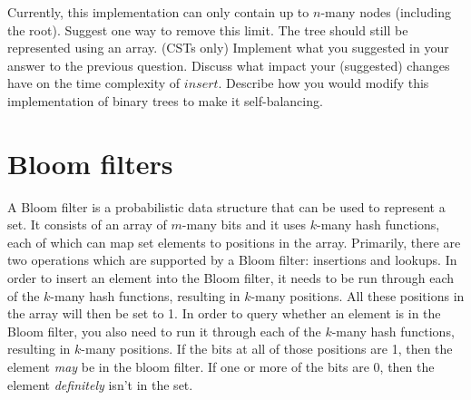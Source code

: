 \documentclass[10pt,a4paper,fleqn]{exam}
\begin{document}
\begin{questions}
\begin{parts}
\begin{subparts}
\subpart[2] Currently, this implementation can only contain up to $n$-many nodes (including the root). Suggest one way to remove this limit. The tree should still be represented using an array. \droppoints 
\subpart[4] (CSTs only) Implement what you suggested in your answer to the previous question. \droppoints
\subpart[6] Discuss what impact your (suggested) changes have on the time complexity of $\mathit{insert}$. \droppoints 
\subpart[6] Describe how you would modify this implementation of binary trees to make it self-balancing. \droppoints 
\end{subparts} 
\end{parts}

\section{Bloom filters}

\question A Bloom filter is a probabilistic data structure that can be used to represent a set. It consists of an array of $m$-many bits and it uses $k$-many hash functions, each of which can map set elements to positions in the array. Primarily, there are two operations which are supported by a Bloom filter: insertions and lookups. In order to insert an element into the Bloom filter, it needs to be run through each of the $k$-many hash functions, resulting in $k$-many positions. All these positions in the array will then be set to 1. In order to query whether an element is in the Bloom filter, you also need to run it through each of the $k$-many hash functions, resulting in $k$-many positions. If the bits at all of those positions are 1, then the element \emph{may} be in the bloom filter. If one or more of the bits are 0, then the element \emph{definitely} isn't in the set.
\end{questions}
\end{document}
